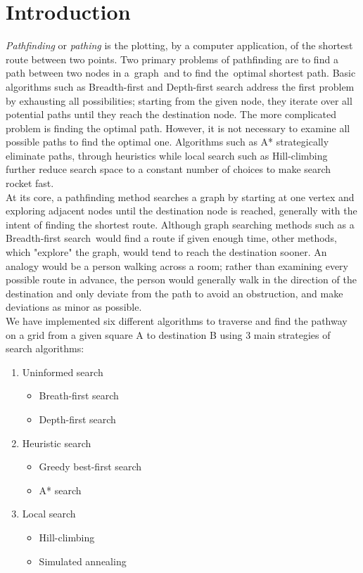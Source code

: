 \documentclass[a4paper]{article}
\begin{document}
\section{Introduction}

\emph{Pathfinding} or \emph{pathing} is the plotting, by a computer application, of the shortest route between two points. Two primary problems of pathfinding are to find a path between two nodes in a graph and to find the optimal shortest path. Basic algorithms such as Breadth-first and Depth-first search address the first problem by exhausting all possibilities; starting from the given node, they iterate over all potential paths until they reach the destination node. The more complicated problem is finding the optimal path. However, it is not necessary to examine all possible paths to find the optimal one. Algorithms such as A* strategically eliminate paths, through heuristics while local search such as Hill-climbing further reduce search space to a constant number of choices to make search rocket fast.\\

\noindent At its core, a pathfinding method searches a graph by starting at one vertex and exploring adjacent nodes until the destination node is reached, generally with the intent of finding the shortest route. Although graph searching methods such as a Breadth-first search would find a route if given enough time, other methods, which "explore" the graph, would tend to reach the destination sooner. An analogy would be a person walking across a room; rather than examining every possible route in advance, the person would generally walk in the direction of the destination and only deviate from the path to avoid an obstruction, and make deviations as minor as possible.\\

\noindent We have implemented six different algorithms to traverse and find the pathway on a grid from a given square A to destination B using 3 main strategies of search algorithms:\\

\begin{enumerate}
\item Uninformed search
	\begin{itemize}
		\item Breath-first search
		\item Depth-first search
	\end{itemize}
\item Heuristic search
	\begin{itemize}
		\item Greedy best-first search
		\item A* search
	\end{itemize}
\item Local search
	\begin{itemize}
		\item Hill-climbing
		\item Simulated annealing
	\end{itemize}
\end{enumerate}
\end{document}
